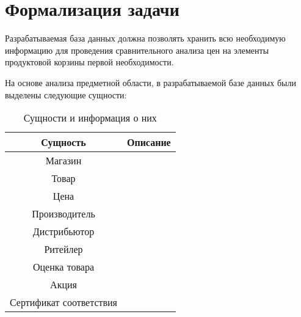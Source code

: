 \section{Формализация задачи}

Разрабатываемая база данных должна позволять хранить всю необходимую информацию для проведения сравнительного анализа цен на элементы продуктовой корзины первой необходимости. 

На основе анализа предметной области, в разрабатываемой базе данных были выделены следующие сущности: 

\begin{table}[ht]
	\small
	\begin{center}
		\begin{threeparttable}
			\caption{Сущности и информация о них}
			\label{tbl:db_essence}
			\begin{tabular}{|c|c|}
				\hline
				\textbf{Сущность} & \textbf{Описание}  \\
				\hline
				Магазин &   \\
				\hline
				Товар &   \\
				\hline
				Цена &  \\
				\hline
				Производитель &   \\
				\hline
				Дистрибьютор &   \\
				\hline
				Ритейлер &   \\
				\hline
				Оценка товара &   \\
				\hline
				Акция &   \\
				\hline
				Сертификат соответствия &   \\
				\hline
			\end{tabular}
		\end{threeparttable}			
	\end{center}
\end{table}

